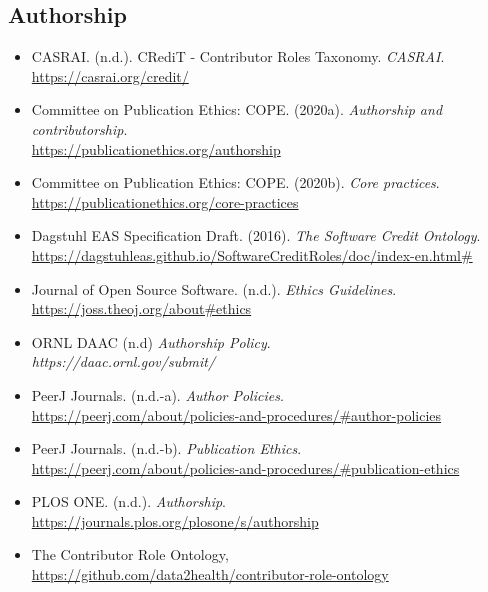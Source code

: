 \documentclass[11pt]{article}
\begin{document}
\vspace*{-2pt}
\subsection{Authorship}
\label{authorship}

\begin{itemize}

\item CASRAI. (n.d.). CRediT - Contributor Roles Taxonomy. \emph{CASRAI}.\\
\url{https://casrai.org/credit/}

\item Committee on Publication Ethics: COPE. (2020a). \emph{Authorship and contributorship}.\\
\url{https://publicationethics.org/authorship}

\item Committee on Publication Ethics: COPE. (2020b). \emph{Core practices}.\\
\url{https://publicationethics.org/core-practices}

\item Dagstuhl EAS Specification Draft. (2016). \emph{The Software Credit Ontology}.\\
\url{https://dagstuhleas.github.io/SoftwareCreditRoles/doc/index-en.html\#}

\item Journal of Open Source Software. (n.d.). \emph{Ethics Guidelines}.\\
\url{https://joss.theoj.org/about\#ethics}

\item ORNL DAAC (n.d) \emph{Authorship Policy}.\\
\emph{https://daac.ornl.gov/submit/}

\item PeerJ Journals. (n.d.-a). \emph{Author Policies}.\\
\url{https://peerj.com/about/policies-and-procedures/\#author-policies}

\item PeerJ Journals. (n.d.-b). \emph{Publication Ethics}.\\
\url{https://peerj.com/about/policies-and-procedures/\#publication-ethics}

\item PLOS ONE. (n.d.). \emph{Authorship}.\\
\url{https://journals.plos.org/plosone/s/authorship}

\item The Contributor Role Ontology,\\
\url{https://github.com/data2health/contributor-role-ontology}

\end{itemize}
\end{document}
